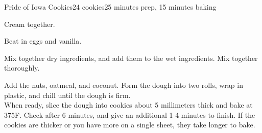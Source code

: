 \documentclass[../Cookbook.tex]{subfiles}
\begin{document}
\begin{recipe}{Pride of Iowa Cookies}{24 cookies}{25 minutes prep, 15 minutes baking}

	Cream together.

	Beat in eggs and vanilla.

	Mix together dry ingredients, and add them to the wet ingredients. Mix together thoroughly.

	Add the nuts, oatmeal, and coconut. Form the dough into two rolls, wrap in plastic, and chill until the dough is firm.\\
	When ready, slice the dough into cookies about 5 millimeters thick and bake at 375\0F. Check after 6 minutes, and give an additional 1-4 minutes to finish. If the cookies are thicker or you have more on a single sheet, they take longer to bake.

\end{recipe}
\end{document}
